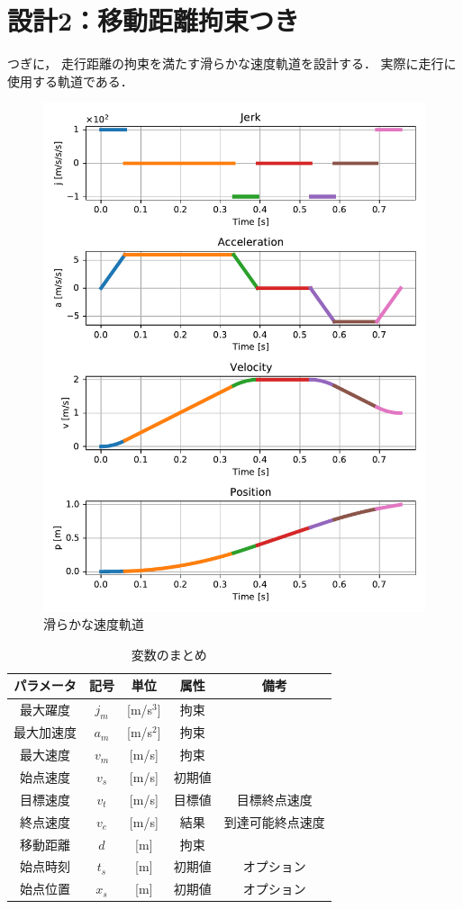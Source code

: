 \documentclass[a5paper]{ltjsarticle}
\begin{document}
\clearpage
\section{設計2：移動距離拘束つき}
つぎに，
走行距離の拘束を満たす滑らかな速度軌道を設計する．
実際に走行に使用する軌道である．
\begin{figure}[htbp]
    \centering
    \includegraphics[width=0.8\linewidth]{figs/accel_designer.pdf}
    \caption{滑らかな速度軌道}
\end{figure}
\begin{table}[htbp]
    \centering
    \caption{変数のまとめ}
    \begin{tabular}{c|c|c|c|c}
        パラメータ & 記号  & 単位        & 属性   & 備考             \\ \hline\hline
        最大躍度   & $j_m$ & [m/s${}^3$] & 拘束   &                  \\
        最大加速度 & $a_m$ & [m/s${}^2$] & 拘束   &                  \\
        最大速度   & $v_m$ & [m/s]       & 拘束   &                  \\
        始点速度   & $v_s$ & [m/s]       & 初期値 &                  \\
        目標速度   & $v_t$ & [m/s]       & 目標値 & 目標終点速度     \\
        終点速度   & $v_e$ & [m/s]       & 結果   & 到達可能終点速度 \\
        移動距離   & $d$   & [m]         & 拘束   &                  \\
        始点時刻   & $t_s$ & [m]         & 初期値 & オプション       \\
        始点位置   & $x_s$ & [m]         & 初期値 & オプション       \\
    \end{tabular}
\end{table}
\end{document}
